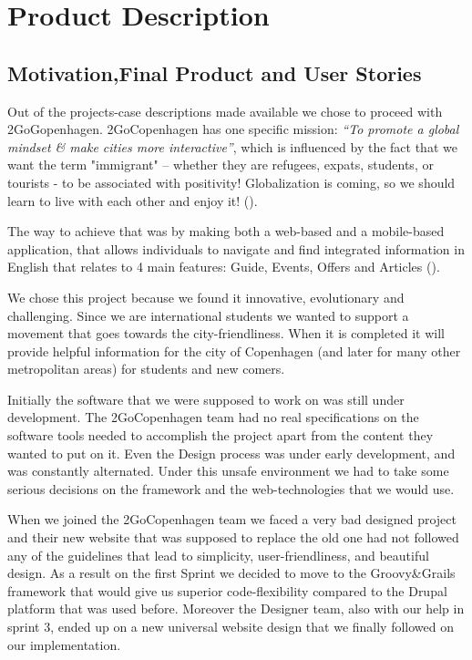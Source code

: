 \section{Product Description}

\subsection{Motivation,Final Product and User Stories}

Out of the projects-case descriptions made available we chose to proceed with 2GoGopenhagen. 2GoCopenhagen has one specific mission: \emph{“To promote a global mindset \& make cities more interactive”}, which is influenced by the fact that we want the term "immigrant" – whether they are refugees, expats, students, or tourists - to be associated with positivity! Globalization is coming, so we should learn to live with each other and enjoy it! (\cite{2GoCPH}).

The way to achieve that was by making both a web-based and a mobile-based application, that allows individuals to navigate and find integrated information in English that relates to 4 main features: Guide, Events, Offers and Articles (\cite{2GoCPH}).

We chose this project because we found it innovative, evolutionary and challenging. Since we are international students we wanted to support a movement that goes towards the city-friendliness. When it is completed it will provide helpful information for the city of Copenhagen (and later for many other metropolitan areas) for students and new comers.

Initially the software that we were supposed to work on was still under development. The 2GoCopenhagen team had no real specifications on the software tools needed to accomplish the project apart from the content they wanted to put on it. Even the Design process was under early development, and was constantly alternated. Under this unsafe environment we had to take some serious decisions on the framework and the web-technologies that we would use.

When we joined the 2GoCopenhagen team we faced a very bad designed project and their new website that was supposed to replace the old one had not followed any of the guidelines that lead to simplicity, user-friendliness, and beautiful design. As a result on the first Sprint we decided to move to the Groovy\&Grails framework that would give us superior code-flexibility compared to the Drupal platform that was used before. Moreover the Designer team, also with our help in sprint 3, ended up on a new universal website design that we finally followed on our implementation.

